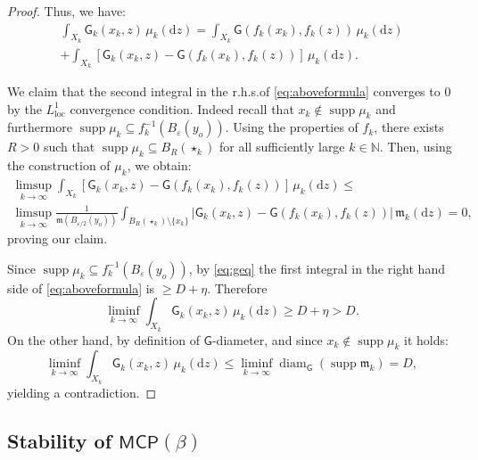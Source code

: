 \documentclass[11pt,a4paper]{article}
\theoremstyle{plain}
\theoremstyle{definition}
\theoremstyle{remark}
\numberwithin{equation}{section}
\newcommand{\N}{\mathbb{N}} %
\DeclareMathOperator{\supp}{\mathrm{supp}}
\newcommand{\ve}{\varepsilon}
\newcommand{\MCP}{\mathsf{MCP}}
\newcommand{\loc}{\mathrm{loc}}
\DeclareMathOperator{\diam}{\mathrm{diam}}
\newcommand{\di}{\mathrm{d}}
\newcommand{\mm}{\mathfrak m}
\newcommand{\sfG}{\mathsf G}
\begin{document}
\begin{proof}
Thus, we have:
\begin{multline}\label{eq:aboveformula}
\int_{X_k} \sfG_k(x_k,z)\, \mu_k(\di z)  = \int_{X_k} \sfG(f_k(x_k),f_k(z))\, \mu_k(\di z) \\ + \int_{X_k}\left[ \sfG_k(x_k,z)- \sfG(f_k(x_k),f_k(z))\right]\, \mu_k(\di z).
\end{multline}

 We claim that the second integral in the r.h.s.\@ of \eqref{eq:aboveformula} converges to $0$ by the $L^1_{\loc}$ convergence condition. Indeed recall that $x_k\notin \supp\mu_k$ and furthermore $\supp\mu_k\subseteq f_k^{-1}(B_\varepsilon(y_o))$. Using the properties of $f_k$, there exists $R>0$ such that $\supp\mu_k\subseteq B_R(\star_k)$ for all sufficiently large $k\in \N$. Then, using the construction of $\mu_k$, we obtain:
\begin{multline}
\limsup_{k\to \infty}\int_{X_k}\left[ \sfG_k(x_k,z)- \sfG(f_k(x_k),f_k(z))\right]\, \mu_k(\di z)  \leq \\ \limsup_{k\to \infty} \frac{1}{\mm(B_{\varepsilon/2}(y_o))}\int_{B_R(\star_k)\setminus \{x_k\}}| \sfG_k(x_k,z)- \sfG(f_k(x_k),f_k(z))|\, \mm_k(\di z) = 0,
\end{multline}
proving our claim.


Since $\supp\mu_k\subseteq f_k^{-1}(B_\ve(y_o))$, by \eqref{eq:geq} the first integral in the right hand side of \eqref{eq:aboveformula} is $\geq D +\eta$. Therefore
\begin{equation}
\liminf_{k\to \infty} \int_{X_k} \sfG_k(x_k,z)\, \mu_k(\di z) \geq D +\eta >D.
\end{equation}
On the other hand, by definition of $\sfG$-diameter,  and since $x_k \notin \supp\mu_k$ it holds:
\begin{equation}
\liminf_{k\to \infty} \int_{X_k} \sfG_k(x_k,z)\, \mu_k(\di z) \leq \liminf_{k\to \infty} \diam_{\sfG}(\supp\mm_k) = D,
\end{equation}
yielding a contradiction.
\end{proof}


\subsection{Stability of \texorpdfstring{$\MCP(\beta)$}{MCP}}
\end{document}
